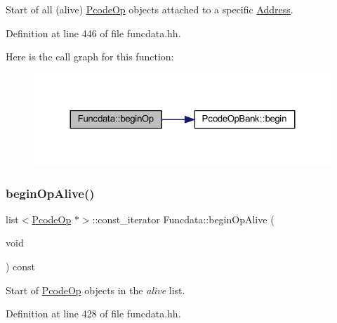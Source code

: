 Start of all (alive) \mbox{\hyperlink{class_pcode_op}{Pcode\+Op}} objects attached to a specific \mbox{\hyperlink{class_address}{Address}}. 



Definition at line 446 of file funcdata.\+hh.

Here is the call graph for this function\+:
\nopagebreak
\begin{figure}[H]
\begin{center}
\leavevmode
\includegraphics[width=324pt]{class_funcdata_a07dbd8a5ef4e19cd8e8c445cf8e43282_cgraph}
\end{center}
\end{figure}
\mbox{\label{class_funcdata_ae1a4f058ff4886d7ae4ceb8160c6f3e0}} 
\subsubsection{\texorpdfstring{beginOpAlive()}{beginOpAlive()}}
{\footnotesize\ttfamily list$<$\mbox{\hyperlink{class_pcode_op}{Pcode\+Op}} $\ast$$>$\+::const\+\_\+iterator Funcdata\+::begin\+Op\+Alive (\begin{DoxyParamCaption}\item[{void}]{ }\end{DoxyParamCaption}) const\hspace{0.3cm}{\ttfamily [inline]}}



Start of \mbox{\hyperlink{class_pcode_op}{Pcode\+Op}} objects in the {\itshape alive} list. 



Definition at line 428 of file funcdata.\+hh.

